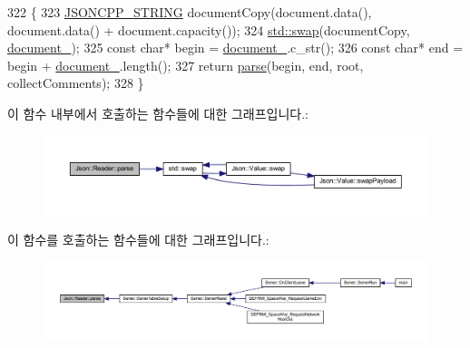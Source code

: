 \begin{DoxyCode}
322                                                                           \{
323   \hyperlink{json-forwards_8h_a1e723f95759de062585bc4a8fd3fa4be}{JSONCPP\_STRING} documentCopy(document.data(), document.data() + document.capacity());
324   \hyperlink{namespacestd_a22cc6fcbbb1f2f705c7888b615e43582}{std::swap}(documentCopy, \hyperlink{class_json_1_1_reader_abf99e137bc92a93623dc97598702261a}{document\_});
325   \textcolor{keyword}{const} \textcolor{keywordtype}{char}* begin = \hyperlink{class_json_1_1_reader_abf99e137bc92a93623dc97598702261a}{document\_}.c\_str();
326   \textcolor{keyword}{const} \textcolor{keywordtype}{char}* end = begin + \hyperlink{class_json_1_1_reader_abf99e137bc92a93623dc97598702261a}{document\_}.length();
327   \textcolor{keywordflow}{return} \hyperlink{class_json_1_1_reader_af1da6c976ad1e96c742804c3853eef94}{parse}(begin, end, root, collectComments);
328 \}
\end{DoxyCode}
이 함수 내부에서 호출하는 함수들에 대한 그래프입니다.\+:\nopagebreak
\begin{figure}[H]
\begin{center}
\leavevmode
\includegraphics[width=350pt]{class_json_1_1_reader_af1da6c976ad1e96c742804c3853eef94_cgraph}
\end{center}
\end{figure}
이 함수를 호출하는 함수들에 대한 그래프입니다.\+:\nopagebreak
\begin{figure}[H]
\begin{center}
\leavevmode
\includegraphics[width=350pt]{class_json_1_1_reader_af1da6c976ad1e96c742804c3853eef94_icgraph}
\end{center}
\end{figure}
\mbox{\label{class_json_1_1_reader_ac71ef2b64c7c27b062052e692af3fb32}} 
